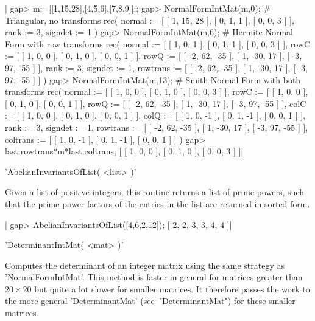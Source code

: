 |    gap> m:=[[1,15,28],[4,5,6],[7,8,9]];;
    gap> NormalFormIntMat(m,0);  # Triangular, no transforms
    rec( normal := [ [ 1, 15, 28 ], [ 0, 1, 1 ], [ 0, 0, 3 ] ], rank := 3,
      signdet := 1 )
    gap> NormalFormIntMat(m,6);  # Hermite Normal Form with row transforms
    rec( normal := [ [ 1, 0, 1 ], [ 0, 1, 1 ], [ 0, 0, 3 ] ],
      rowC := [ [ 1, 0, 0 ], [ 0, 1, 0 ], [ 0, 0, 1 ] ],
      rowQ := [ [ -2, 62, -35 ], [ 1, -30, 17 ], [ -3, 97, -55 ] ], rank := 3,
      signdet := 1,
      rowtrans := [ [ -2, 62, -35 ], [ 1, -30, 17 ], [ -3, 97, -55 ] ] )
    gap> NormalFormIntMat(m,13); # Smith Normal Form with both transforms
    rec( normal := [ [ 1, 0, 0 ], [ 0, 1, 0 ], [ 0, 0, 3 ] ],
      rowC := [ [ 1, 0, 0 ], [ 0, 1, 0 ], [ 0, 0, 1 ] ],
      rowQ := [ [ -2, 62, -35 ], [ 1, -30, 17 ], [ -3, 97, -55 ] ],
      colC := [ [ 1, 0, 0 ], [ 0, 1, 0 ], [ 0, 0, 1 ] ],
      colQ := [ [ 1, 0, -1 ], [ 0, 1, -1 ], [ 0, 0, 1 ] ], rank := 3,
      signdet := 1,
      rowtrans := [ [ -2, 62, -35 ], [ 1, -30, 17 ], [ -3, 97, -55 ] ],
      coltrans := [ [ 1, 0, -1 ], [ 0, 1, -1 ], [ 0, 0, 1 ] ] )
    gap> last.rowtrans*m*last.coltrans;
    [ [ 1, 0, 0 ], [ 0, 1, 0 ], [ 0, 0, 3 ] ]|

'AbelianInvariantsOfList( <list> )'

Given  a list of  positive integers, this  routine returns a  list of prime
powers,  such that the prime  power factors of the  entries in the list are
returned in sorted form.

|    gap> AbelianInvariantsOfList([4,6,2,12]);
    [ 2, 2, 3, 3, 4, 4 ]|


'DeterminantIntMat( <mat> )'

Computes  the determinant of  an integer matrix  using the same strategy as
'NormalFormIntMat'.  This method is faster  in general for matrices greater
than  $20  \times  20$  but  quite  a  lot  slower for smaller matrices. It
therefore   passes   the   work   to   the  more  general  'DeterminantMat'
(see~"DeterminantMat") for these smaller matrices.


